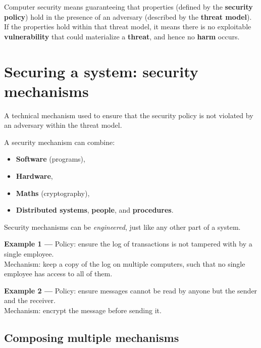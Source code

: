 \begin{remark}
Computer security means guaranteeing that properties (defined by the \textbf{security policy}) hold in the presence of an adversary (described by the \textbf{threat model}). If the properties hold within that threat model, it means there is no exploitable \textbf{vulnerability} that could materialize a \textbf{threat}, and hence no \textbf{harm} occurs.
\end{remark}

\section{Securing a system: security mechanisms}

\begin{definition}
A technical mechanism used to ensure that the security policy is not violated by an adversary within the threat model.
\end{definition}

A security mechanism can combine:
\begin{itemize}
    \item \textbf{Software} (programs),
    \item \textbf{Hardware},
    \item \textbf{Maths} (cryptography),
    \item \textbf{Distributed systems}, \textbf{people}, and \textbf{procedures}.
\end{itemize}

\begin{remark}
Security mechanisms can be \emph{engineered}, just like any other part of a system.
\end{remark}

\begin{example}
\textbf{Example 1 — } Policy: ensure the log of transactions is not tampered with by a single employee.\\
Mechanism: keep a copy of the log on multiple computers, such that no single employee has access to all of them.

\medskip
\textbf{Example 2 — } Policy: ensure messages cannot be read by anyone but the sender and the receiver.\\
Mechanism: encrypt the message before sending it.
\end{example}

\subsection{Composing multiple mechanisms}

